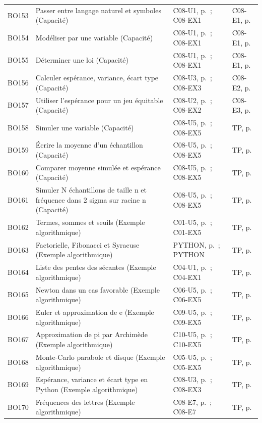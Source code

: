 \begin{longtable}{p{.1\linewidth}p{.43\linewidth}p{.19\linewidth}p{.16\linewidth}}
BO153 & Passer entre langage naturel et symboles (Capacité) & C08-U1, p.\,\pageref{C08-U1} ; C08-EX1 & C08-E1, p.\,\pageref{C08-E1} \\
BO154 & Modéliser par une variable (Capacité) & C08-U1, p.\,\pageref{C08-U1} ; C08-EX1 & C08-E1, p.\,\pageref{C08-E1} \\
BO155 & Déterminer une loi (Capacité) & C08-U1, p.\,\pageref{C08-U1} ; C08-EX1 & C08-E1, p.\,\pageref{C08-E1} \\
BO156 & Calculer espérance, variance, écart type (Capacité) & C08-U3, p.\,\pageref{C08-U3} ; C08-EX3 & C08-E2, p.\,\pageref{C08-E2} \\
BO157 & Utiliser l’espérance pour un jeu équitable (Capacité) & C08-U2, p.\,\pageref{C08-U2} ; C08-EX2 & C08-E3, p.\,\pageref{C08-E3} \\
BO158 & Simuler une variable (Capacité) & C08-U5, p.\,\pageref{C08-U5} ; C08-EX5 & TP, p.\,\pageref{TP} \\
BO159 & Écrire la moyenne d’un échantillon (Capacité) & C08-U5, p.\,\pageref{C08-U5} ; C08-EX5 & TP, p.\,\pageref{TP} \\
BO160 & Comparer moyenne simulée et espérance (Capacité) & C08-U5, p.\,\pageref{C08-U5} ; C08-EX5 & TP, p.\,\pageref{TP} \\
BO161 & Simuler N échantillons de taille n et fréquence dans 2 sigma sur racine n (Capacité) & C08-U5, p.\,\pageref{C08-U5} ; C08-EX5 & TP, p.\,\pageref{TP} \\
BO162 & Termes, sommes et seuils (Exemple algorithmique) & C01-U5, p.\,\pageref{C01-U5} ; C01-EX5 & TP, p.\,\pageref{TP} \\
BO163 & Factorielle, Fibonacci et Syracuse (Exemple algorithmique) & PYTHON, p.\,\pageref{PYTHON} ; PYTHON & TP, p.\,\pageref{TP} \\
BO164 & Liste des pentes des sécantes (Exemple algorithmique) & C04-U1, p.\,\pageref{C04-U1} ; C04-EX1 & TP, p.\,\pageref{TP} \\
BO165 & Newton dans un cas favorable (Exemple algorithmique) & C06-U5, p.\,\pageref{C06-U5} ; C06-EX5 & TP, p.\,\pageref{TP} \\
BO166 & Euler et approximation de e (Exemple algorithmique) & C09-U5, p.\,\pageref{C09-U5} ; C09-EX5 & TP, p.\,\pageref{TP} \\
BO167 & Approximation de pi par Archimède (Exemple algorithmique) & C10-U5, p.\,\pageref{C10-U5} ; C10-EX5 & TP, p.\,\pageref{TP} \\
BO168 & Monte-Carlo parabole et disque (Exemple algorithmique) & C05-U5, p.\,\pageref{C05-U5} ; C05-EX5 & TP, p.\,\pageref{TP} \\
BO169 & Espérance, variance et écart type en Python (Exemple algorithmique) & C08-U3, p.\,\pageref{C08-U3} ; C08-EX3 & TP, p.\,\pageref{TP} \\
BO170 & Fréquences des lettres (Exemple algorithmique) & C08-E7, p.\,\pageref{C08-E7} ; C08-E7 & TP, p.\,\pageref{TP} \\
\bottomrule\end{longtable}\normalsize